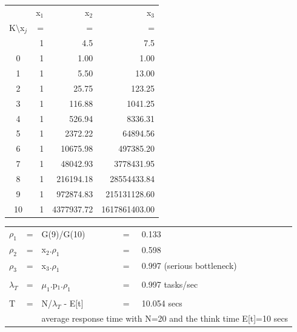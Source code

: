 \documentclass[12pt,fleqn]{report}
\begin{document}
\begin{center}
\begin{tabular}{|| c |r  r r|| }

\hline
                  & {x$_1$}
                  & {x$_2$}
                  & {x$_3$}\\

K$\setminus$x$_j$ & =      & =      & =    \\
                  & 1      & 4.5      & 7.5     \\
\hline
0                 & 1      &  1.00       &  1.00     \\
1                 & 1      &  5.50     &  13.00     \\
2                 & 1      &  25.75   &  123.25     \\
3                 & 1      &  116.88 &  1041.25     \\
4                 & 1      &  526.94   & 8336.31     \\
5                 & 1      & 2372.22   & 64894.56\\
6                 & 1      & 10675.98  &497385.20\\
7                 & 1      &  48042.93 & 3778431.95\\
8                 & 1      & 216194.18 & 28554433.84\\
9                 & 1      & 972874.83 & 215131128.60\\
10                & 1      & 4377937.72& 1617861403.00\\
\hline
\end{tabular}
\end{center}






\begin{center}
\begin{tabular}{l c l c l}
$\rho_1$    & =  & G(9)/G(10) & = & 0.133\\
$\rho_2$ & = &  x$_2$.$\rho_1$ & = & 0.598\\
$\rho_3$ & = &  x$_3$.$\rho_1$ & = & 0.997 (serious bottleneck) \\
&&&&\\
$\lambda_T$ &= & $\mu_1$.p$_1$.$\rho_1$ & = & 0.997 tasks/sec\\
&&&&\\
T           & = & N/$\lambda_T$ - E[t] & = & 10.054 secs\\
            &   & \multicolumn{3}{r}{average response time with N=20
and the think time E[t]=10 secs}\\
\end{tabular}
\end{center}
\end{document}
